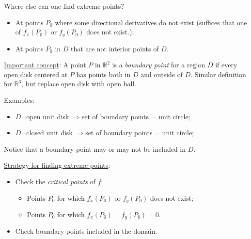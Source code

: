 \begin{frame}
  \frametitle{}

Where else can one find extreme points?\pause

\begin{itemize}
  \item At points $P_0$ where some directional derivatives do not exist (suffices that one of $f_x(P_0)$ or $f_y(P_0)$ does not exist.);
  \item At points $P_0$ in $D$ that are not interior points of $D$.
\end{itemize}

\pause
\underline{Important concept}: A point $P$ in $\mathbb{R}^2$ is a \emph{boundary point} for a region $D$ if every open disk centered at $P$ has points both in $D$ and outside of $D$. Similar definition for $\mathbb{R}^3$, but replace open disk with open ball.

\pause
Examples:
\begin{itemize}
  \item $D$=open unit disk $\Longrightarrow$\pause set of boundary points = unit circle;\pause
  \item $D$=closed unit disk $\Longrightarrow$\pause set of boundary points = unit circle;\pause
\end{itemize}
%
Notice that a boundary point may or may not be included in $D$.

\pause
\underline{Strategy for finding extreme points}:
%
\begin{itemize}
  \item Check the \emph{critical points} of $f$:
  \begin{itemize}
    \item Points $P_0$ for which $f_x(P_0)$ or $f_y(P_0)$ does not exist;
    \item Points $P_0$ for which $f_x(P_0)=f_y(P_0)=0$.
  \end{itemize}
  \item Check boundary points included in the domain.
\end{itemize}
\end{frame}
